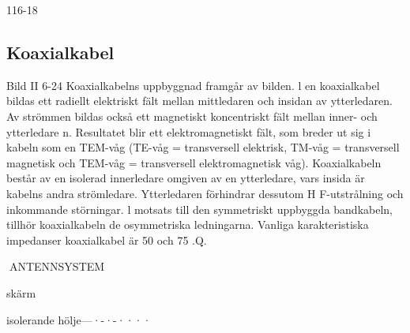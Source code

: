116-18

\subsection{Koaxialkabel}

Bild II 6-24
Koaxialkabelns uppbyggnad framgår av bilden. l en koaxialkabel bildas ett radiellt
elektriskt fält mellan mittledaren och insidan
av ytterledaren. Av strömmen bildas också
ett magnetiskt koncentriskt fält mellan inner- och ytterledare n. Resultatet blir ett elektromagnetiskt fält, som breder ut sig i kabeln
som en TEM-våg (TE-våg = transversell
elektrisk, TM-våg = transversell magnetisk
och TEM-våg = transversell elektromagnetisk våg).
Koaxialkabeln består av en isolerad innerledare omgiven av en ytterledare, vars insida är kabelns andra strömledare. Ytterledaren förhindrar dessutom H F-utstrålning
och inkommande störningar. l motsats till
den symmetriskt uppbyggda bandkabeln,
tillhör koaxialkabeln de osymmetriska ledningarna.
Vanliga karakteristiska impedanser
koaxialkabel är 50 och 75 .Q.

ANTENNSYSTEM

skärm

isolerande hölje---·-·-····

